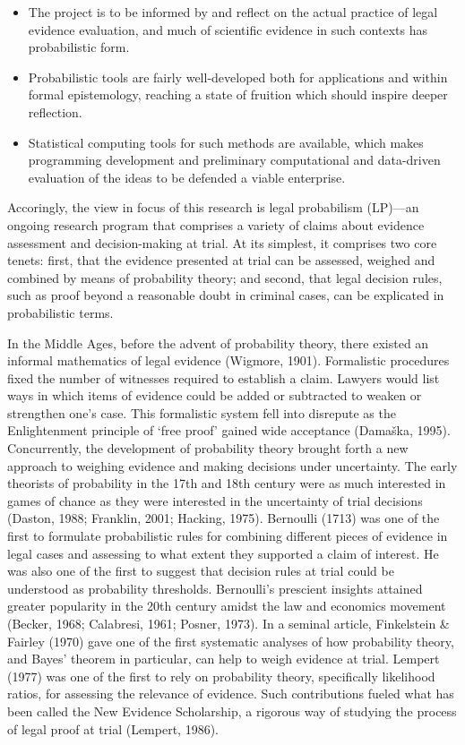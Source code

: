 \documentclass[11pt,dvipsnames,enabledeprecatedfontcommands]{scrartcl}
\begin{document}
\begin{itemize}
\item
  The project is to be informed by and reflect on the actual practice of
  legal evidence evaluation, and much of scientific evidence in such
  contexts has probabilistic form.
\item
  Probabilistic tools are fairly well-developed both for applications
  and within formal epistemology, reaching a state of fruition which
  should inspire deeper reflection.
\item
  Statistical computing tools for such methods are available, which
  makes programming development and preliminary computational and
  data-driven evaluation of the ideas to be defended a viable
  enterprise.
\end{itemize}

Accoringly, the view in focus of this research is legal probabilism
(LP)---an ongoing research program that comprises a variety of claims
about evidence assessment and decision-making at trial. At its simplest,
it comprises two core tenets: first, that the evidence presented at
trial can be assessed, weighed and combined by means of probability
theory; and second, that legal decision rules, such as proof beyond a
reasonable doubt in criminal cases, can be explicated in probabilistic
terms.

In the Middle Ages, before the advent of probability theory, there
existed an informal mathematics of legal evidence (Wigmore, 1901).
Formalistic procedures fixed the number of witnesses required to
establish a claim. Lawyers would list ways in which items of evidence
could be added or subtracted to weaken or strengthen one's case. This
formalistic system fell into disrepute as the Enlightenment principle of
`free proof' gained wide acceptance (Damaška, 1995). Concurrently, the
development of probability theory brought forth a new approach to
weighing evidence and making decisions under uncertainty. The early
theorists of probability in the 17th and 18th century were as much
interested in games of chance as they were interested in the uncertainty
of trial decisions (Daston, 1988; Franklin, 2001; Hacking, 1975).
Bernoulli (1713) was one of the first to formulate probabilistic rules
for combining different pieces of evidence in legal cases and assessing
to what extent they supported a claim of interest. He was also one of
the first to suggest that decision rules at trial could be understood as
probability thresholds. Bernoulli's prescient insights attained greater
popularity in the 20th century amidst the law and economics movement
(Becker, 1968; Calabresi, 1961; Posner, 1973). In a seminal article,
Finkelstein \& Fairley (1970) gave one of the first systematic analyses
of how probability theory, and Bayes' theorem in particular, can help to
weigh evidence at trial. Lempert (1977) was one of the first to rely on
probability theory, specifically likelihood ratios, for assessing the
relevance of evidence. Such contributions fueled what has been called
the New Evidence Scholarship, a rigorous way of studying the process of
legal proof at trial (Lempert, 1986).
\end{document}
